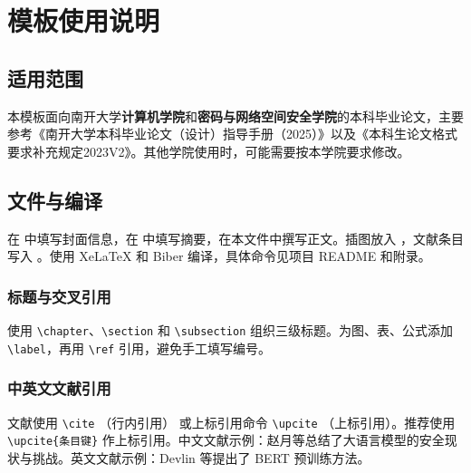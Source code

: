 \chapter{模板使用说明}
\label{chap:guide}

\section{适用范围}
本模板面向南开大学\textbf{计算机学院}和\textbf{密码与网络空间安全学院}的本科毕业论文，主要参考《南开大学本科毕业论文（设计）指导手册（2025）》以及《本科生论文格式要求补充规定2023V2》。其他学院使用时，可能需要按本学院要求修改。

\section{文件与编译}
在  中填写封面信息，在  中填写摘要，在本文件中撰写正文。插图放入 ，文献条目写入 。使用 XeLaTeX 和 Biber 编译，具体命令见项目 README 和附录。

\subsection{标题与交叉引用}
使用 \verb|\chapter|、\verb|\section| 和 \verb|\subsection| 组织三级标题。为图、表、公式添加 \verb|\label|，再用 \verb|\ref| 引用，避免手工填写编号。

\subsection{中英文文献引用}
文献使用 \verb|\cite| （行内引用\cite{BERT}） 或上标引用命令 \verb|\upcite| （上标引用）。推荐使用 \verb|\upcite{条目键}| 作上标引用。中文文献示例：赵月等总结了大语言模型的安全现状与挑战。英文文献示例：Devlin 等提出了 BERT 预训练方法。

